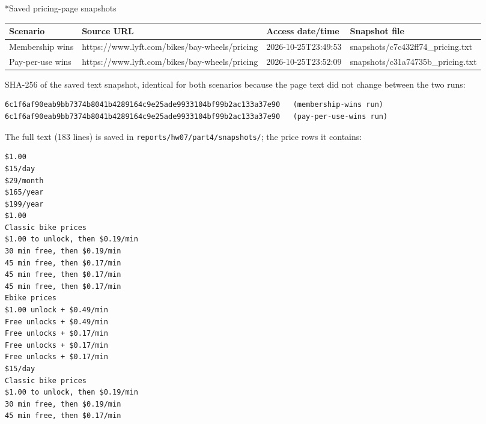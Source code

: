 \documentclass[11pt]{article}
\makeatletter
\renewcommand\subsection{\@startsection{subsection}{2}{\z@}{-2.2ex \@plus -1ex \@minus -.2ex}{0.8ex \@plus.2ex}{\normalfont\fontsize{12}{14.5}\selectfont\bfseries}}
\makeatother
\begin{document}
\subsection*{Saved pricing-page snapshots}
\begin{center}
{\footnotesize\setlength{\tabcolsep}{3pt}
\begin{tabular}{p{1.0in}p{2.1in}p{1.2in}p{1.9in}}
\toprule
\textbf{Scenario} & \textbf{Source URL} & \textbf{Access date/time} & \textbf{Snapshot file} \\
\midrule
Membership wins & https://www.lyft.com/bikes/bay-wheels/pricing & 2026-10-25T23:49:53 & snapshots/c7c432ff74\_pricing.txt \\
Pay-per-use wins & https://www.lyft.com/bikes/bay-wheels/pricing & 2026-10-25T23:52:09 & snapshots/c31a74735b\_pricing.txt \\
\bottomrule
\end{tabular}}
\end{center}
SHA-256 of the saved text snapshot, identical for both scenarios because the page text did not change between the two runs:

\begingroup\lstset{basicstyle=\ttfamily\scriptsize}
\begin{lstlisting}
6c1f6af90eab9bb7374b8041b4289164c9e25ade9933104bf99b2ac133a37e90   (membership-wins run)
6c1f6af90eab9bb7374b8041b4289164c9e25ade9933104bf99b2ac133a37e90   (pay-per-use-wins run)
\end{lstlisting}
\endgroup
The full text (183 lines) is saved in \texttt{reports/\allowbreak{}hw07/\allowbreak{}part4/\allowbreak{}snapshots/\allowbreak{}}; the price rows it contains:

\begingroup\lstset{basicstyle=\ttfamily\tiny}
\begin{lstlisting}
$1.00
$15/day
$29/month
$165/year
$199/year
$1.00
Classic bike prices
$1.00 to unlock, then $0.19/min
30 min free, then $0.19/min
45 min free, then $0.17/min
45 min free, then $0.17/min
45 min free, then $0.17/min
Ebike prices
$1.00 unlock + $0.49/min
Free unlocks + $0.49/min
Free unlocks + $0.17/min
Free unlocks + $0.17/min
Free unlocks + $0.17/min
$15/day
Classic bike prices
$1.00 to unlock, then $0.19/min
30 min free, then $0.19/min
45 min free, then $0.17/min
\end{lstlisting}
\endgroup
\end{document}
